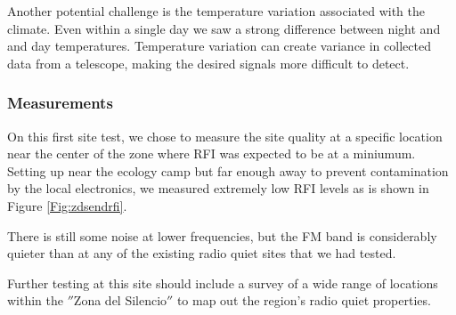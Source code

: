 Another potential challenge is the temperature variation associated with the climate. Even within a single day we saw a strong difference between night and and day temperatures. Temperature variation can create variance in collected data from a telescope, making the desired signals more difficult to detect. 

\subsubsection{Measurements}

On this first site test, we chose to measure the site quality at a specific location near the center of the zone where RFI was expected to be at a miniumum. Setting up near the ecology camp but far enough away to prevent contamination by the local electronics, we measured extremely low RFI levels as is shown in Figure \ref{Fig:zdsendrfi}.

There is still some noise at lower frequencies, but the FM band is considerably quieter than at any of the existing radio quiet sites that we had tested. 

Further testing at this site should include a survey of a wide range of locations within the $''$Zona del Silencio$''$ to map out the region's radio quiet properties. 

